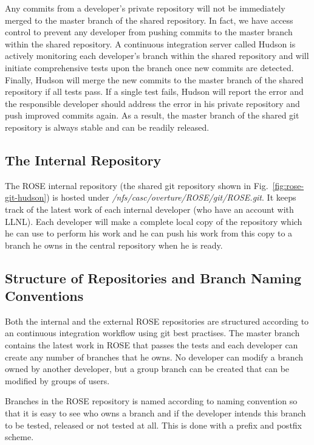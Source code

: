 Any commits from a developer's private repository will not be immediately merged to the master branch
of the shared repository. In fact, we have access control to prevent any developer from pushing commits 
to the master branch within the shared repository.
A continuous integration server called Hudson is actively monitoring each developer's branch within the shared repository 
and will initiate comprehensive tests upon the branch once new commits are detected.
Finally, Hudson will merge the new commits to the master branch of the shared repository if all tests pass.
If a single test fails, Hudson will report the error and the responsible developer should address the error in 
his private repository and push improved commits again. 
As a result, the master branch of the shared git repository is always stable and can be readily released.  


\subsection{The Internal Repository}

The ROSE internal repository (the shared git repository shown in
Fig.~\ref{fig:rose-git-hudson}) is hosted under \textit{/nfs/casc/overture/ROSE/git/ROSE.git}.
It keeps track of the latest work of each
internal developer (who have an account with LLNL). Each
developer will make a complete local copy of the repository which he can use to
perform his work and he can push his work from this copy to a branch he owns in the 
central repository when he is ready. 

\subsection{Structure of Repositories and Branch Naming Conventions}


Both the internal and the external ROSE repositories are structured according to
an continuous integration workflow using git best practises. The master branch
contains the latest work in ROSE that passes the tests and each developer can
create any number of branches that he owns. No developer can modify
a branch owned by another developer, but a group branch can be created that 
can be modified by groups of users. 

Branches in the ROSE repository is named according to naming convention so that 
it is easy to see who owns a branch and if the developer intends this branch to
be tested, released or not tested at all. This is done with a prefix and postfix
scheme.

